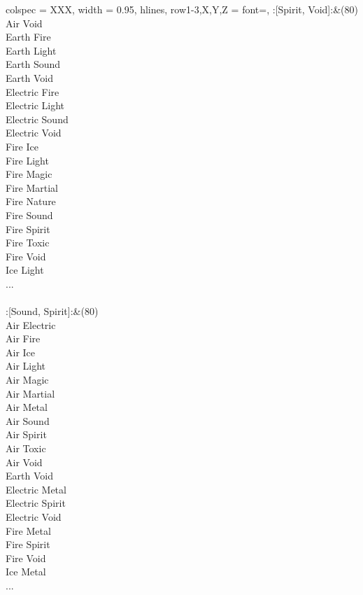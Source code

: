 \begin{longtblr}[
	caption = {2v2 Defending Weak},
	label = {2v2-Defending-Weak},
]{
	colspec = {XXX}, width = 0.95\linewidth,
	hlines,
	row{1-3,X,Y,Z} = {font=\bfseries},
}
	:[Spirit, Void]:&{(80)\\
	Air Void \\
	Earth Fire \\
	Earth Light \\
	Earth Sound \\
	Earth Void \\
	Electric Fire \\
	Electric Light \\
	Electric Sound \\
	Electric Void \\
	Fire Ice \\
	Fire Light \\
	Fire Magic \\
	Fire Martial \\
	Fire Nature \\
	Fire Sound \\
	Fire Spirit \\
	Fire Toxic \\
	Fire Void \\
	Ice Light \\
	...\\
	}\\

	:[Sound, Spirit]:&{(80)\\
	Air Electric \\
	Air Fire \\
	Air Ice \\
	Air Light \\
	Air Magic \\
	Air Martial \\
	Air Metal \\
	Air Sound \\
	Air Spirit \\
	Air Toxic \\
	Air Void \\
	Earth Void \\
	Electric Metal \\
	Electric Spirit \\
	Electric Void \\
	Fire Metal \\
	Fire Spirit \\
	Fire Void \\
	Ice Metal \\
	...\\
	}\\


\end{longtblr}
